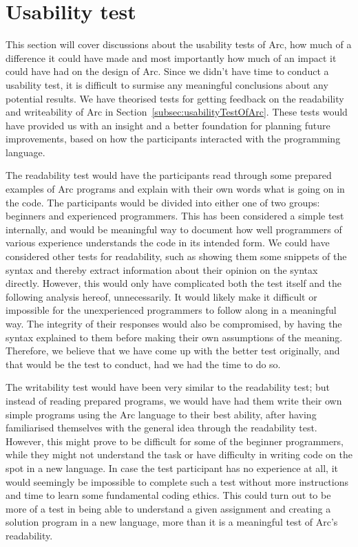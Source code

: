 \section{Usability test}\label{sec:discussion_usabilityTest}

This section will cover discussions about the usability tests of Arc, how much of a difference it could have made and most importantly how much of an impact it could have had on the design of Arc. Since we didn't have time to conduct a usability test, it is difficult to surmise any meaningful conclusions about any potential results. We have theorised tests for getting feedback on the readability and writeability of Arc in Section~\ref{subsec:usabilityTestOfArc}. These tests would have provided us with an insight and a better foundation for planning future improvements, based on how the participants interacted with the programming language.

The readability test would have the participants read through some prepared examples of Arc programs and explain with their own words what is going on in the code. The participants would be divided into either one of two groups: beginners and experienced programmers. This has been considered a simple test internally, and would be meaningful way to document how well programmers of various experience understands the code in its intended form. We could have considered other tests for readability, such as showing them some snippets of the syntax and thereby extract information about their opinion on the syntax directly. However, this would only have complicated both the test itself and the following analysis hereof, unnecessarily. It would likely make it difficult or impossible for the unexperienced programmers to follow along in a meaningful way. The integrity of their responses would also be compromised, by having the syntax explained to them before making their own assumptions of the meaning. Therefore, we believe that we have come up with the better test originally, and that would be the test to conduct, had we had the time to do so.

The writability test would have been very similar to the readability test; but instead of reading prepared programs, we would have had them write their own simple programs using the Arc language to their best ability, after having familiarised themselves with the general idea through the readability test. However, this might prove to be difficult for some of the beginner programmers, while they might not understand the task or have difficulty in writing code on the spot in a new language. In case the test participant has no experience at all, it would seemingly be impossible to complete such a test without more instructions and time to learn some fundamental coding ethics. This could turn out to be more of a test in being able to understand a given assignment and creating a solution program in a new language, more than it is a meaningful test of Arc's readability.


